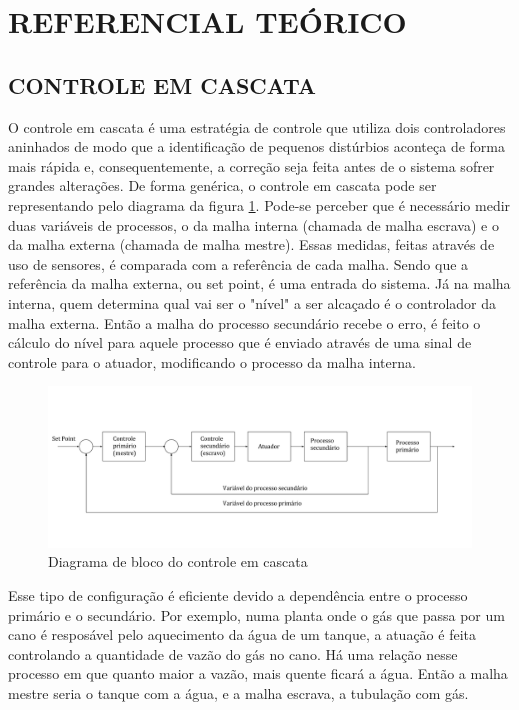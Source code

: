 \documentclass[a4paper,12pt]{article}
\begin{document}
\newpage


\thispagestyle{main}

\section{REFERENCIAL TEÓRICO}

\subsection{CONTROLE EM CASCATA}
\hspace{4ex}O controle em cascata é uma estratégia de controle que utiliza dois controladores aninhados de modo que a identificação de pequenos distúrbios aconteça de forma mais rápida e, consequentemente, a correção seja feita antes de o sistema sofrer grandes alterações. De forma genérica, o controle em cascata pode ser representando pelo diagrama da figura \ref{cascata}. Pode-se perceber que é necessário medir duas variáveis de processos, o da malha interna (chamada de malha escrava) e o da malha externa (chamada de malha mestre). Essas medidas, feitas através de uso de sensores, é comparada com a referência de cada malha. Sendo que a referência da malha externa, ou set point, é uma entrada do sistema. Já na malha interna, quem determina qual vai ser o "nível" a ser alcaçado é o controlador da malha externa. Então a malha do processo secundário recebe o erro, é feito o cálculo do nível para aquele processo que é enviado através de uma sinal de controle para o atuador, modificando o processo da malha interna.     

\begin{figure}[h]
\centering
\includegraphics[width=17cm]{ImagensLab4/controle-em-cascata.png}
\caption{Diagrama de bloco do controle em cascata}
\label{cascata}
\end{figure}

Esse tipo de configuração é eficiente devido a dependência entre o processo primário e o secundário. Por exemplo, numa planta onde o gás que passa por um cano é resposável pelo aquecimento da água de um tanque, a atuação é feita controlando a quantidade de vazão do gás no cano. Há uma relação nesse processo em que quanto maior a vazão, mais quente ficará a água. Então a malha mestre seria o tanque com a água, e a malha escrava, a tubulação com gás. 
\end{document}
